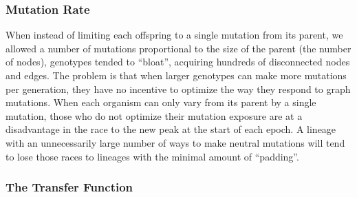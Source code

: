 \documentclass[letterpaper]{article}
\begin{document}

%
%

\subsubsection{Mutation Rate}

When instead of limiting each offspring to a single mutation from its parent,
we allowed a number of mutations proportional to the size of the parent (the
number of nodes), genotypes tended to ``bloat'', acquiring hundreds of
disconnected nodes and edges. The problem is that when larger genotypes can
make more mutations per generation, they have no incentive to optimize the way
they respond to graph mutations.  When each organism can only vary from its
parent by a single mutation, those who do not optimize their mutation exposure
are at a disadvantage in the race to the new peak at the start of each epoch.
A lineage with an unnecessarily large number of ways to make neutral mutations
will tend to lose those races to lineages with the minimal amount of
``padding''.

\subsubsection{The Transfer Function}
\end{document}
